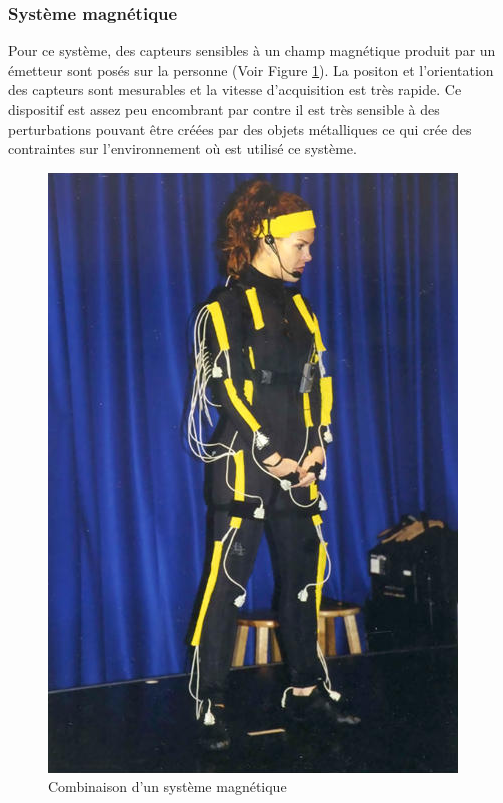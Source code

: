 \subsubsection{Système magnétique}
Pour ce système, des capteurs sensibles à un champ magnétique produit par un émetteur sont posés sur la personne (Voir Figure \ref{fig9}). La positon et l'orientation des capteurs sont mesurables et la vitesse d'acquisition est très rapide. Ce dispositif est assez peu encombrant par contre il est très sensible à des perturbations pouvant être créées par des objets métalliques ce qui crée des contraintes sur l'environnement où est utilisé ce système.
\begin{figure}[!h]
   	\centerline{\includegraphics[scale=0.4]{images/biblio/magne}}
   	\caption{\label{fig9} Combinaison d'un système magnétique}
\end{figure}

